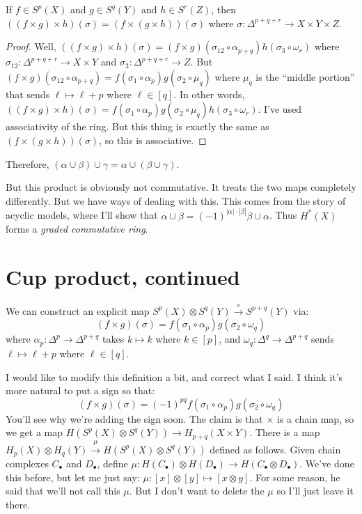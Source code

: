 \begin{prop}
If $f\in S^p(X)$ and $g\in S^q(Y)$ and $h\in S^r(Z)$, then $((f\times g)\times h)(\sigma)=(f\times(g\times h))(\sigma)$ where $\sigma:\Delta^{p+q+r}\to X\times Y\times Z$.
\end{prop}
\begin{proof}
Well, $((f\times g)\times h)(\sigma)=(f\times g)(\sigma_{12}\circ\alpha_{p+q})h(\sigma_3\circ\omega_r)$ where $\sigma_{12}:\Delta^{p+q+r}\to X\times Y$ and $\sigma_3:\Delta^{p+q+r}\to Z$. But $(f\times g)(\sigma_{12}\circ\alpha_{p+q})=f(\sigma_1\circ\alpha_p)g(\sigma_2\circ\mu_q)$ where $\mu_q$ is the ``middle portion'' that sends $\ell\mapsto \ell+p$ where $\ell\in[q]$. In other words, $((f\times g)\times h)(\sigma)=f(\sigma_1\circ\alpha_p)g(\sigma_2\circ\mu_q)h(\sigma_3\circ\omega_r)$. I've used associativity of the ring. But this thing is exactly the same as $(f\times(g\times h))(\sigma)$, so this is associative.
\end{proof}
Therefore, $(\alpha\cup\beta)\cup\gamma=\alpha\cup(\beta\cup\gamma)$.

But this product is obviously not commutative. It treats the two maps completely differently. But we have ways of dealing with this. This comes from the story of acyclic models, where I'll show that $\alpha\cup\beta=(-1)^{|\alpha|\cdot|\beta|}\beta\cup\alpha$. Thus $ H^\ast(X)$ forms a \emph{graded commutative ring}.
\section{Cup product, continued}
We can construct an explicit map $S^p(X)\otimes S^q(Y)\xrightarrow{\times} S^{p+q}(Y)$ via:
\begin{equation*}
(f\times g)(\sigma)=f(\sigma_1\circ\alpha_p)g(\sigma_2\circ\omega_q)
\end{equation*}
where $\alpha_p:\Delta^p\to\Delta^{p+q}$ takes $k\mapsto k$ where $k\in[p]$, and $\omega_q:\Delta^q\to\Delta^{p+q}$ sends $\ell\mapsto \ell+p$ where $\ell\in[q]$.

I would like to modify this definition a bit, and correct what I said. I think it's more natural to put a sign so that:
\begin{equation*}
(f\times g)(\sigma)=(-1)^{pq}f(\sigma_1\circ\alpha_p)g(\sigma_2\circ\omega_q)
\end{equation*}
You'll see why we're adding the sign soon. The claim is that $\times$ is a chain map, so we get a map $ H(S^p(X)\otimes S^q(Y))\to H_{p+q}(X\times Y)$. There is a map $ H_p(X)\otimes H_q(Y)\xrightarrow{\mu} H(S^p(X)\otimes S^q(Y))$ defined as follows. Given chain complexes $C_\bullet$ and $D_\bullet$, define $\mu: H(C_\bullet)\otimes H(D_\bullet)\to H(C_\bullet\otimes D_\bullet)$. We've done this before, but let me just say: $\mu:[x]\otimes [y]\mapsto [x\otimes y]$. For some reason, he said that we'll not call this $\mu$. But I don't want to delete the $\mu$ so I'll just leave it there.

